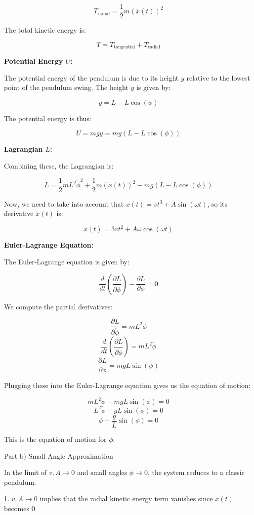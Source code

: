 \[ T_{\text{radial}} = \frac{1}{2} m (\dot{x}(t))^2 \]

The total kinetic energy is:

\[ T = T_{\text{tangential}} + T_{\text{radial}} \]

\textbf{Potential Energy \( U \):}

The potential energy of the pendulum is due to its height \( y \) relative to the lowest point of the pendulum swing. The height \( y \) is given by:

\[ y = L - L \cos(\phi) \]

The potential energy is thus:

\[ U = m g y = m g (L - L \cos(\phi)) \]

\textbf{Lagrangian \( L \):}

Combining these, the Lagrangian is:

\[ L = \frac{1}{2} m L^2 \dot{\phi}^2 + \frac{1}{2} m (\dot{x}(t))^2 - m g (L - L \cos(\phi)) \]

Now, we need to take into account that \( x(t) = v t^3 + A \sin(\omega t) \), so its derivative \( \dot{x}(t) \) is:

\[ \dot{x}(t) = 3 v t^2 + A \omega \cos(\omega t) \]

\textbf{Euler-Lagrange Equation:}

The Euler-Lagrange equation is given by:

\[ \frac{d}{dt} \left(\frac{\partial L}{\partial \dot{\phi}}\right) - \frac{\partial L}{\partial \phi} = 0 \]

We compute the partial derivatives:

\[ \frac{\partial L}{\partial \dot{\phi}} = m L^2 \dot{\phi} \]
\[ \frac{d}{dt} \left(\frac{\partial L}{\partial \dot{\phi}}\right) = m L^2 \ddot{\phi} \]
\[ \frac{\partial L}{\partial \phi} = m g L \sin(\phi) \]

Plugging these into the Euler-Lagrange equation gives us the equation of motion:

\[ m L^2 \ddot{\phi} - m g L \sin(\phi) = 0 \]
\[ L^2 \ddot{\phi} - g L \sin(\phi) = 0 \]
\[ \ddot{\phi} - \frac{g}{L} \sin(\phi) = 0 \]

This is the equation of motion for \( \phi \).

Part b) Small Angle Approximation

In the limit of \( v, A \rightarrow 0 \) and small angles \( \phi \rightarrow 0 \), the system reduces to a classic pendulum.

1. \( v, A \rightarrow 0 \) implies that the radial kinetic energy term vanishes since \( \dot{x}(t) \) becomes 0.

